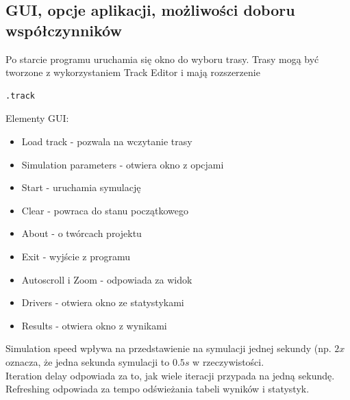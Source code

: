 \documentclass{article}
\begin{document}




\subsection{GUI, opcje aplikacji, możliwości doboru współczynników}
Po starcie programu uruchamia się okno do wyboru trasy. Trasy mogą być tworzone z wykorzystaniem Track Editor i mają rozszerzenie \begin{verbatim}
.track
\end{verbatim}

Elementy GUI:
\begin{itemize}
\item Load track - pozwala na wczytanie trasy
\item Simulation parameters - otwiera okno z opcjami
\item Start - uruchamia symulację
\item Clear - powraca do stanu początkowego
\item About - o twórcach projektu
\item Exit - wyjście z programu
\item Autoscroll i Zoom - odpowiada za widok	
\item Drivers - otwiera okno ze statystykami
\item Results - otwiera okno z wynikami
\end{itemize}

Simulation speed wpływa na przedstawienie na symulacji jednej sekundy (np. $2x$ oznacza, że jedna sekunda symulacji to $0.5s$ w rzeczywistości. \\
Iteration delay odpowiada za to, jak wiele iteracji przypada na jedną sekundę. \\
Refreshing odpowiada za tempo odświeżania tabeli wyników i statystyk.\\
\end{document}
